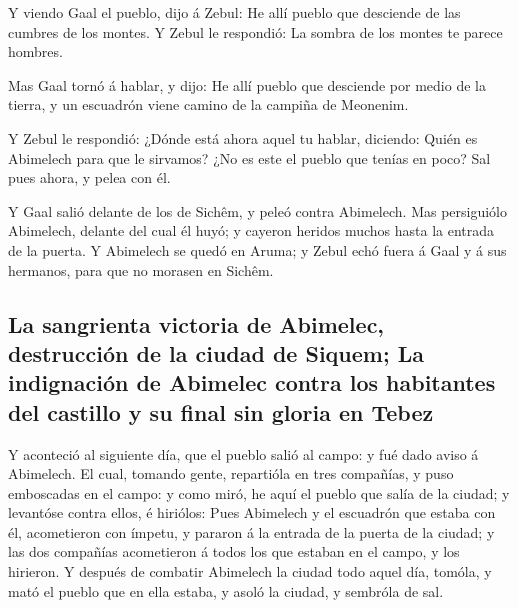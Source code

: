  Y viendo Gaal el pueblo, dijo á Zebul: He allí pueblo que
desciende de las cumbres de los montes. Y Zebul le respondió: La sombra
de los montes te parece hombres.

 Mas Gaal tornó á hablar, y dijo: He allí pueblo que
desciende por medio de la tierra, y un escuadrón viene camino de la
campiña de Meonenim.

 Y Zebul le respondió: ¿Dónde está ahora aquel tu hablar,
diciendo: Quién es Abimelech para que le sirvamos? ¿No es este el pueblo
que tenías en poco? Sal pues ahora, y pelea con él.

 Y Gaal salió delante de los de Sichêm, y peleó contra
Abimelech.  Mas persiguiólo Abimelech, delante del cual él
huyó; y cayeron heridos muchos hasta la entrada de la puerta.
 Y Abimelech se quedó en Aruma; y Zebul echó fuera á Gaal y
á sus hermanos, para que no morasen en Sichêm.

\hypertarget{la-sangrienta-victoria-de-abimelec-destrucciuxf3n-de-la-ciudad-de-siquem-la-indignaciuxf3n-de-abimelec-contra-los-habitantes-del-castillo-y-su-final-sin-gloria-en-tebez}{%
\subsection{La sangrienta victoria de Abimelec, destrucción de la ciudad
de Siquem; La indignación de Abimelec contra los habitantes del castillo
y su final sin gloria en
Tebez}\label{la-sangrienta-victoria-de-abimelec-destrucciuxf3n-de-la-ciudad-de-siquem-la-indignaciuxf3n-de-abimelec-contra-los-habitantes-del-castillo-y-su-final-sin-gloria-en-tebez}}

 Y aconteció al siguiente día, que el pueblo salió al
campo: y fué dado aviso á Abimelech.  El cual, tomando
gente, repartióla en tres compañías, y puso emboscadas en el campo: y
como miró, he aquí el pueblo que salía de la ciudad; y levantóse contra
ellos, é hiriólos:  Pues Abimelech y el escuadrón que
estaba con él, acometieron con ímpetu, y pararon á la entrada de la
puerta de la ciudad; y las dos compañías acometieron á todos los que
estaban en el campo, y los hirieron.  Y después de combatir
Abimelech la ciudad todo aquel día, tomóla, y mató el pueblo que en ella
estaba, y asoló la ciudad, y sembróla de sal.

